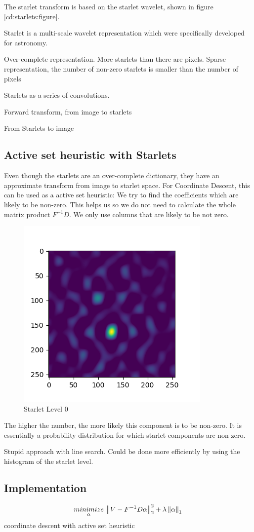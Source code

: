The starlet transform is based on the starlet wavelet, shown in figure \ref{cd:starlets:figure}. 


Starlet is a multi-scale wavelet representation which were specifically developed for astronomy.

Over-complete representation. More starlets than there are pixels. Sparse representation, the number of non-zero starlets is smaller than the number of pixels


Starlets as a series of convolutions.

Forward transform, from image to starlets

From Starlets to image

\subsection{Active set heuristic with Starlets}\label{cd:heuristic}
Even though the starlets are an over-complete dictionary, they have an approximate transform from image to starlet space. For Coordinate Descent, this can be used as a active set heuristic: We try to find the coefficients which are likely to be non-zero. This helps us so we do not need to calculate the whole matrix product $F^{-1}D$. We only use columns that are likely to be not zero.

\begin{figure}[h]
	\centering
	\includegraphics[width=0.5\linewidth]{./chapters/05.algorithms/sim02/starlets0.png}
	\caption{Starlet Level 0}
	\label{alg:heuristic:starlet}
\end{figure}

The higher the number, the more likely this component is to be non-zero. It is essentially a probability distribution for which starlet components are non-zero.

Stupid approach with line search. Could be done more efficiently by using the histogram of the starlet level.

\subsection{Implementation}

\begin{equation}\label{cd:starlet}
\underset{\alpha}{minimize} \: \left \| V - F^{-1}D\alpha \right \|_2^2 + \lambda \left \| \alpha \right \|_1 \\
\end{equation}
coordinate descent with active set heuristic

